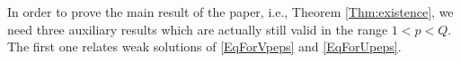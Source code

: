 \documentclass[10pt]{amsart}
\numberwithin{equation}{section}
\theoremstyle{definition}
\newcommand{\He}{\mathbb{H}}
\begin{document}
%  






In order to prove the main result of the paper, i.e., Theorem \ref{Thm:existence}, we need three auxiliary results which are actually still valid in the range $1<p<Q$. The first one relates weak solutions of \eqref{EqForVpeps} and \eqref{EqForUpeps}.
\end{document}
